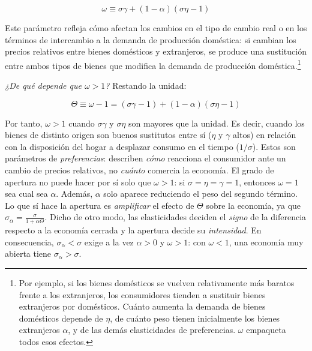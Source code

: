 \documentclass[10pt,a4paper]{article}
\begin{document}
$$\omega\equiv\sigma\gamma+(1-\alpha)(\sigma\eta-1)$$

Este parámetro refleja cómo afectan los cambios en el tipo de cambio real o en los términos de intercambio a la demanda de producción doméstica: si cambian los precios relativos entre bienes domésticos y extranjeros, se produce una sustitución entre ambos tipos de bienes que modifica la demanda de producción doméstica.\footnote{
  Por ejemplo, si los bienes domésticos se vuelven relativamente más baratos frente a los extranjeros, los consumidores tienden a sustituir bienes extranjeros por domésticos. Cuánto aumenta la demanda de bienes domésticos depende de $\eta$, de cuánto peso tienen inicialmente los bienes extranjeros $\alpha$, y de las demás elasticidades de preferencias. $\omega$ empaqueta todos esos efectos.
}

\textit{¿De qué depende que $\omega>1$?} Restando la unidad:

$$\Theta\equiv\omega-1=(\sigma\gamma-1)+(1-\alpha)(\sigma\eta-1)$$

Por tanto, $\omega>1$ cuando $\sigma\gamma$ y $\sigma\eta$ son mayores que la unidad. Es decir, cuando los bienes de distinto origen son buenos sustitutos entre sí ($\eta$ y $\gamma$ altos) en relación con la disposición del hogar a desplazar consumo en el tiempo ($1/\sigma$). Estos son parámetros de \textit{preferencias}: describen \textit{cómo} reacciona el consumidor ante un cambio de precios relativos, no \textit{cuánto} comercia la economía. El grado de apertura no puede hacer por sí solo que $\omega>1$: si $\sigma=\eta=\gamma=1$, entonces $\omega=1$ sea cual sea $\alpha$. Además, $\alpha$ solo aparece reduciendo el peso del segundo término. Lo que sí hace la apertura es \textit{amplificar} el efecto de $\Theta$ sobre la economía, ya que $\sigma_\alpha=\frac{\sigma}{1+\alpha\Theta}$. Dicho de otro modo, las elasticidades deciden el \textit{signo} de la diferencia respecto a la economía cerrada y la apertura decide su \textit{intensidad}. En consecuencia, $\sigma_\alpha<\sigma$ exige a la vez $\alpha>0$ y $\omega>1$: con $\omega<1$, una economía muy abierta tiene $\sigma_\alpha>\sigma$.
\end{document}
